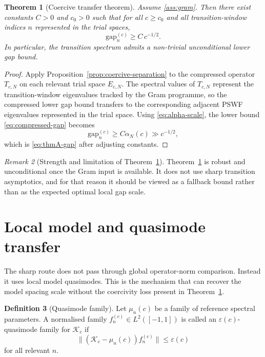 \documentclass[12pt,a4paper]{amsart}
\newtheorem{theorem}{Theorem}[section]
\theoremstyle{definition}
\newtheorem{definition}[theorem]{Definition}
\theoremstyle{remark}
\newtheorem{remark}[theorem]{Remark}
\newcommand{\norm}[1]{\|#1\|}
\newcommand{\Kc}{\mathcal{K}_c}
\newcommand{\gapc}[2]{\mathrm{gap}_{#2}^{(#1)}}
\begin{document}
\begin{theorem}[Coercive transfer theorem]
\label{thm:A}
Assume \ref{ass:gram}.
Then there exist constants $C>0$ and $c_0>0$ such that for all
$c\ge c_0$ and all transition-window indices $n$ represented in the trial
spaces,
\begin{equation}\label{eq:thmA-gap}
  \gapc{c}{n} \ge C\, c^{-1/2}.
\end{equation}
In particular, the transition spectrum admits a non-trivial unconditional
lower gap bound.
\end{theorem}

\begin{proof}
Apply Proposition~\ref{prop:coercive-separation} to the compressed operator
$T_{c,N}$ on each relevant trial space $E_{c,N}$.
The spectral values of $T_{c,N}$ represent the transition-window eigenvalues
tracked by the Gram programme, so the compressed lower gap bound transfers to
the corresponding adjacent PSWF eigenvalues represented in the trial space.
Using \eqref{eq:alpha-scale}, the lower bound \eqref{eq:compressed-gap}
becomes
\[
  \gapc{c}{n} \ge C\alpha_N(c) \gg c^{-1/2},
\]
which is \eqref{eq:thmA-gap} after adjusting constants.
\end{proof}

\begin{remark}[Strength and limitation of Theorem~\ref{thm:A}]
Theorem~\ref{thm:A} is robust and unconditional once the Gram input is
available.
It does not use sharp transition asymptotics, and for that reason it should
be viewed as a fallback bound rather than as the expected optimal local gap
scale.
\end{remark}

\section{Local model and quasimode transfer}
\label{sec:quasimode}

The sharp route does not pass through global operator-norm comparison.
Instead it uses local model quasimodes.
This is the mechanism that can recover the model spacing scale without the
coercivity loss present in Theorem~\ref{thm:A}.

\begin{definition}[Quasimode family]
Let $\mu_n(c)$ be a family of reference spectral parameters.
A normalised family $f_n^{(c)}\in L^2([-1,1])$ is called an
$\varepsilon(c)$-quasimode family for $\Kc$ if
\begin{equation}\label{eq:quasimode}
  \norm{(\Kc-\mu_n(c))f_n^{(c)}} \le \varepsilon(c)
\end{equation}
for all relevant $n$.
\end{definition}
\end{document}
